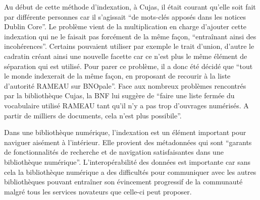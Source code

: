Au début de cette méthode d'indexation, à Cujas, il était courant qu'elle soit fait par différente personnes car il s'agissait \enquote{de mots-clés apposés dans les notices Dublin Core}. Le problème vient de la multiplication en charge d'ajouter cette indexation qui ne le faisait pas forcément de la même façon, \enquote{entraînant ainsi des incohérences}. Certains pouvaient utiliser par exemple le trait d'union, d'autre le cadratin créant ainsi une nouvelle facette car ce n'est plus le même élément de séparation qui est utilisé. Pour parer ce problème, il a donc été décidé que \enquote{tout le monde indexerait de la même façon, en proposant de recourir à la liste d'autorité RAMEAU sur BNOpale}. Face aux nombreux problèmes rencontrés par la bibliothèque Cujas, la BNF lui suggère de \enquote{faire une liste fermée du vocabulaire utilisé RAMEAU tant qu'il n'y a pas trop d'ouvrages numérisés. A partir de milliers de documents, cela n'est plus possibile}. 

Dans une bibliothèque numérique, l'indexation est un élément important pour naviguer aisément à l'intérieur. Elle provient des métadonnées qui sont \enquote{garants de fonctionnalités de recherche et de navigation satisfaisantes dans une bibliothèque numérique}. L'interopérabilité des données est importante car sans cela la bibliothèque numérique a des difficultés pour communiquer avec les autres bibliothèques pouvant entraîner son évincement progressif de la communauté malgré tous les services novateurs que celle-ci peut proposer.